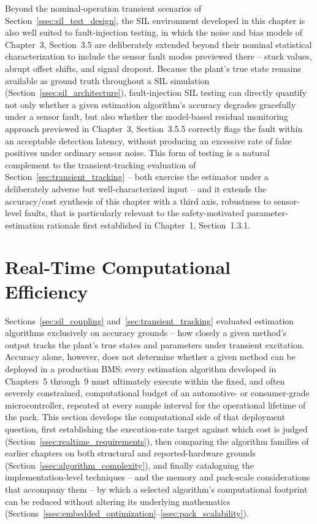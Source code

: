 Beyond the nominal-operation transient scenarios of Section~\ref{ssec:sil_test_design}, the SIL environment developed in this chapter is also well suited to fault-injection testing, in which the noise and bias models of Chapter~3, Section~3.5 are deliberately extended beyond their nominal statistical characterization to include the sensor fault modes previewed there -- stuck values, abrupt offset shifts, and signal dropout. Because the plant's true state remains available as ground truth throughout a SIL simulation (Section~\ref{ssec:sil_architecture}), fault-injection SIL testing can directly quantify not only whether a given estimation algorithm's accuracy degrades gracefully under a sensor fault, but also whether the model-based residual monitoring approach previewed in Chapter~3, Section~3.5.5 correctly flags the fault within an acceptable detection latency, without producing an excessive rate of false positives under ordinary sensor noise. This form of testing is a natural complement to the transient-tracking evaluation of Section~\ref{sec:transient_tracking} -- both exercise the estimator under a deliberately adverse but well-characterized input -- and it extends the accuracy/cost synthesis of this chapter with a third axis, robustness to sensor-level faults, that is particularly relevant to the safety-motivated parameter-estimation rationale first established in Chapter~1, Section~1.3.1.

\section{Real-Time Computational Efficiency}
\label{sec:realtime_efficiency}

Sections~\ref{sec:sil_coupling} and~\ref{sec:transient_tracking} evaluated estimation algorithms exclusively on accuracy grounds -- how closely a given method's output tracks the plant's true states and parameters under transient excitation. Accuracy alone, however, does not determine whether a given method can be deployed in a production BMS: every estimation algorithm developed in Chapters~5 through~9 must ultimately execute within the fixed, and often severely constrained, computational budget of an automotive- or consumer-grade microcontroller, repeated at every sample interval for the operational lifetime of the pack. This section develops the computational side of that deployment question, first establishing the execution-rate target against which cost is judged (Section~\ref{ssec:realtime_requirements}), then comparing the algorithm families of earlier chapters on both structural and reported-hardware grounds (Section~\ref{ssec:algorithm_complexity}), and finally cataloguing the implementation-level techniques -- and the memory and pack-scale considerations that accompany them -- by which a selected algorithm's computational footprint can be reduced without altering its underlying mathematics (Sections~\ref{ssec:embedded_optimization}--\ref{ssec:pack_scalability}).

